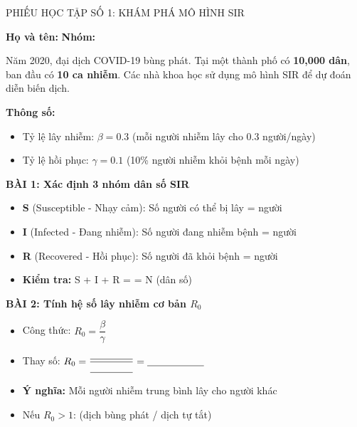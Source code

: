 \documentclass[12pt,a4paper]{article}
\begin{document}
\begin{phieuhoctap}{PHIẾU HỌC TẬP SỐ 1: KHÁM PHÁ MÔ HÌNH SIR}

\noindent\textbf{Họ và tên:} \underline{\hspace{6cm}} \hfill \textbf{Nhóm:} \underline{\hspace{2cm}}

\vspace{0.5cm}
\begin{tinhuong}
Năm 2020, đại dịch COVID-19 bùng phát. Tại một thành phố có \textbf{10,000 dân}, ban đầu có \textbf{10 ca nhiễm}. Các nhà khoa học sử dụng mô hình SIR để dự đoán diễn biến dịch.

\textbf{Thông số:}
\begin{itemize}
\item Tỷ lệ lây nhiễm: $\beta = 0.3$ (mỗi người nhiễm lây cho 0.3 người/ngày)
\item Tỷ lệ hồi phục: $\gamma = 0.1$ (10\% người nhiễm khỏi bệnh mỗi ngày)
\end{itemize}
\end{tinhuong}

\vspace{0.5cm}
\textbf{\color{accent}BÀI 1: Xác định 3 nhóm dân số SIR}
\begin{itemize}
\item \textbf{S} (Susceptible - Nhạy cảm): Số người có thể bị lây = \underline{\hspace{4cm}} người
\item \textbf{I} (Infected - Đang nhiễm): Số người đang nhiễm bệnh = \underline{\hspace{4cm}} người
\item \textbf{R} (Recovered - Hồi phục): Số người đã khỏi bệnh = \underline{\hspace{4cm}} người
\item \textbf{Kiểm tra:} S + I + R = \underline{\hspace{2cm}} = N (dân số)
\end{itemize}

\vspace{0.5cm}
\textbf{\color{accent}BÀI 2: Tính hệ số lây nhiễm cơ bản $R_0$}
\begin{itemize}
\item Công thức: $R_0 = \dfrac{\beta}{\gamma}$
\item Thay số: $R_0 = \dfrac{\underline{\hspace{1.5cm}}}{\underline{\hspace{1.5cm}}} = \underline{\hspace{2cm}}$
\item \textbf{Ý nghĩa:} Mỗi người nhiễm trung bình lây cho \underline{\hspace{2cm}} người khác
\item Nếu $R_0 > 1$: \underline{\hspace{6cm}} (dịch bùng phát / dịch tự tắt)
\end{itemize}


\end{phieuhoctap}
\end{document}
